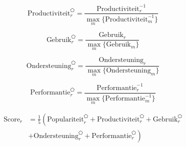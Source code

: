 \begin{equation}
  \text{Productiviteit}_r^{\pentagon} = \frac{\text{Productiviteit}_r^{-1}}{\underset{m}{\max}\{\text{Productiviteit}_m^{-1}\}}
  \label{eq:rel-productiviteit}
\end{equation}

\begin{equation}
  \text{Gebruik}_r^{\pentagon} = \frac{\text{Gebruik}_r}{\underset{m}{\max}\{\text{Gebruik}_m\}}
  \label{eq:rel-gebruik}
\end{equation}

\begin{equation}
  \text{Ondersteuning}_r^{\pentagon} = \frac{\text{Ondersteuning}_r}{\underset{m}{\max}\{\text{Ondersteuning}_m\}}
  \label{eq:rel-ondersteuning}
\end{equation}

\begin{equation}
  \text{Performantie}_r^{\pentagon}= \frac{\text{Performantie}_r^{-1}}{\underset{m}{\max}\{\text{Performantie}_m^{-1}\}}
  \label{eq:rel-performantie}
\end{equation}

\begin{equation}
\begin{split}
  \text{Score}_r &= \frac{1}{5} \left( \text{Populariteit}_r^{\pentagon}
  + \text{Productiviteit}_r^{\pentagon} 
  + \text{Gebruik}_r^{\pentagon} \right. \\
  &+ \left. \text{Ondersteuning}_r^{\pentagon}
  + \text{Performantie}_r^{\pentagon} \right)
  \end{split}
  \label{eq:rel-totaal}
\end{equation}
